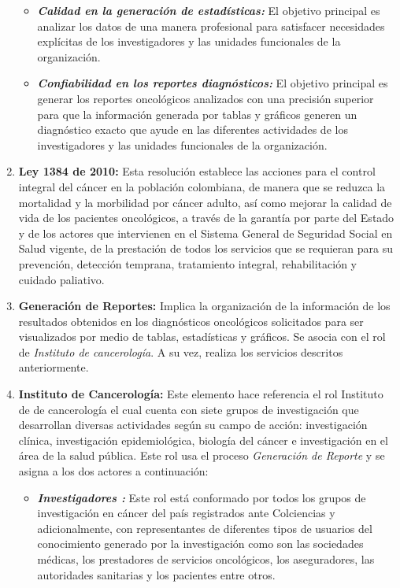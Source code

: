 \begin{enumerate}[label=\textbf{\arabic*})]
\begin{itemize}
		\item  \textbf{\textit{Calidad en la generación de estadísticas:}} El objetivo principal es analizar los datos de una manera profesional   para satisfacer necesidades explícitas de los investigadores y las unidades funcionales de la organización. 
		
		\item  \textbf{\textit{Confiabilidad en los reportes diagnósticos:}} El objetivo principal es generar los reportes oncológicos analizados  con una precisión superior para que la información generada por tablas y gráficos generen un diagnóstico exacto que ayude en las diferentes actividades de los investigadores y las unidades funcionales de la organización.
		
\end{itemize}

	\item  \textbf{Ley 1384 de 2010:} Esta resolución establece las acciones para el control integral del cáncer en la población colombiana, de manera que se reduzca la mortalidad y la morbilidad por cáncer adulto, así como mejorar la calidad de vida de los pacientes oncológicos, a través de la garantía por parte del Estado y de los actores que intervienen en el Sistema General de Seguridad Social en Salud vigente, de la prestación de todos los servicios que se requieran para su prevención, detección temprana, tratamiento integral, rehabilitación y cuidado paliativo.
	
	\item  \textbf{Generación de Reportes:} Implica la organización de la información de los resultados obtenidos en los diagnósticos oncológicos solicitados para ser visualizados por medio de tablas, estadísticas y gráficos. Se asocia con el rol de \textit{Instituto  de cancerología}. A su vez, realiza los servicios descritos anteriormente.
	
	
	\item  \textbf{Instituto  de Cancerología:} Este elemento hace referencia el rol  Instituto de  de cancerología el cual cuenta con siete grupos de investigación que desarrollan diversas actividades según su campo de acción: investigación clínica, investigación epidemiológica, biología del cáncer e investigación en el área de la salud pública. Este rol usa el proceso \textit{Generación de Reporte} y se asigna a los dos actores a continuación:
	
	\begin{itemize}
		\item  \textbf{\textit{Investigadores :}}  Este rol está conformado por todos los grupos de investigación en cáncer del país registrados ante Colciencias y adicionalmente, con representantes de diferentes tipos de usuarios del conocimiento generado por la investigación como son las sociedades médicas, los prestadores de servicios oncológicos, los aseguradores, las autoridades sanitarias y los pacientes entre otros. 
		

\end{itemize}
\end{enumerate}
